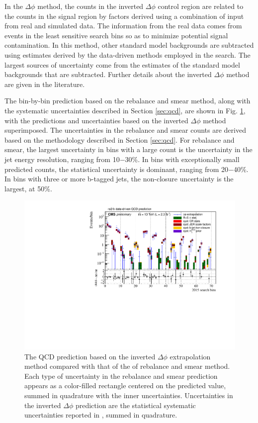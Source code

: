 In the $\Delta\phi$ method, the counts in the inverted $\Delta\phi$ control region are related to the counts in the signal region by factors derived using a combination of input from real and simulated data. The information from the real data comes from events in the least sensitive search bins so as to minimize potential signal contamination. In this method, other standard model backgrounds are subtracted using estimates derived by the data-driven methods employed in the search. The largest sources of uncertainty come from the estimates of the standard model backgrounds that are subtracted. Further details about the inverted $\Delta\phi$ method are given in the literature.

The bin-by-bin prediction based on the rebalance and smear method, along with the systematic uncertainties described in Section \ref{sec:qcd}, are shown in Fig. \ref{fig:2015CompareQCD}, with the predictions and uncertainties based on the inverted $\Delta\phi$ method superimposed. The uncertainties in the rebalance and smear counts are derived based on the methodology described in Section \ref{sec:qcd}. For rebalance and smear, the largest uncertainty in bins with a large count is the uncertainty in the jet energy resolution, ranging from 10$-$30\%. In bins with exceptionally small predicted counts, the statistical uncertainty is dominant, ranging from 20$-$40\%. In bins with three or more b-tagged jets, the non-closure uncertainty is the largest, at 50\%. 
\begin{figure}[tb!]
\centering
\includegraphics[width=\linewidth]{figures/SusySearches/Ra2b2015/2015CompareQCDErrors.pdf}
\caption{ The QCD prediction based on the inverted $\Delta\phi$ extrapolation method compared with that of the of rebalance and smear method. Each type of uncertainty in the rebalance and smear prediction appears as a color-filled rectangle centered on the predicted value, summed in quadrature with the inner uncertainties. Uncertainties in the inverted $\Delta\phi$ prediction are the statistical systematic uncertainties reported in \cite{Khachatryan:2016kdk}, summed in quadrature.}
\label{fig:2015CompareQCD}
\end{figure}

